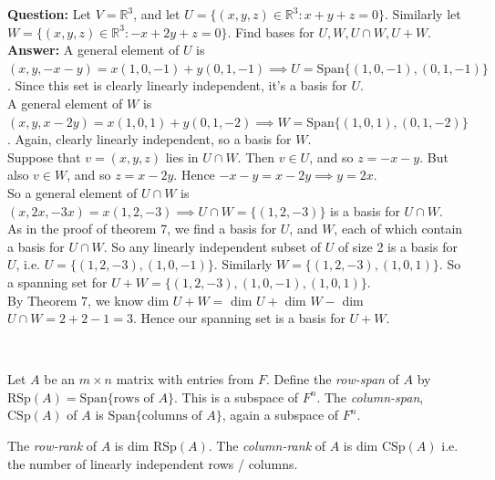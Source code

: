 \documentclass[twoside]{scrartcl}
\begin{document}
\begin{example} \textbf{Question:}  
 Let $V = \mathbb{R}^3$, and let $U= \{(x,y,z) \in \mathbb{R}^3: x + y + z = 0\}.$ Similarly let $W = \{(x,y,z) \in \mathbb{R}^3: -x + 2y + z = 0\}.$ Find bases for $U, W, U \cap W, U + W$. \\

\textbf{Answer:} A general element of $U$ is $(x,y,-x-y) = x(1,0,-1) + y(0,1,-1) \implies U = \text{Span}\{(1,0,-1),(0,1,-1)\}$. Since this set is clearly linearly independent, it's a basis for $U$.\\

A general element of $W$ is $(x,y,x-2y) = x(1,0,1) + y(0,1,-2) \implies W = \text{Span}\{(1,0,1),(0,1,-2)\}$. Again, clearly linearly independent, so a basis for $W$.\\

Suppose that $v = (x,y,z)$ lies in $U \cap W$. Then $v \in U$, and so $z = -x-y$. But also $v \in W$, and so $z = x - 2y$. Hence $-x-y = x-2y \implies y = 2x$.\\

So a general element of $U \cap W$ is $(x,2x,-3x) = x(1,2,-3) \implies U\cap W = \{(1,2,-3)\} $ is a basis for $U\cap W$.\\


As in the proof of theorem 7, we find a basis for $U$, and $W$, each of which contain a basis for $U \cap W$. So any linearly independent subset of $U$ of size 2 is a basis for $U$, i.e. $U = \{(1,2,-3),(1,0,-1)\}$. Similarly $W = \{(1,2,-3),(1,0,1)\} $. So a spanning set for $U + W = \{(1,2,-3),(1,0,-1),(1,0,1)\}$.\\

By Theorem 7, we know dim $U+W = $ dim $U + $ dim $W - $ dim $U\cap W = 2 + 2 -1 = 3.$ Hence our spanning set is a basis for $U + W$.
\end{example}~


\vspace*{5pt}

\begin{definition}Let $A$ be an $m \times n$ matrix with entries from $F$. Define the \emph{row-span} of $A$ by $\text{RSp}(A) = \text{Span}\{\text{rows of }A\}$. This is a subspace of $F^n$. The \emph{column-span}, $\text{CSp}(A)$ of $A$ is  $\text{Span}\{\text{columns of }A\}$, again a subspace of $F^n$.	

The \emph{row-rank} of $A$ is dim $\text{RSp}(A)$. The \emph{column-rank} of $A$ is dim $\text{CSp}(A)$ i.e. the number of linearly independent rows / columns.
\end{definition}
\end{document}
